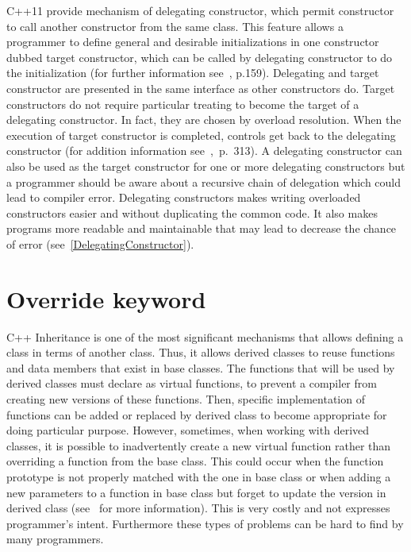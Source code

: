 \documentclass[11pt]{report}
\begin{document}
C++11 provide mechanism of delegating constructor, which permit constructor to call another constructor from the same class. This feature allows a programmer to define general and desirable initializations in one constructor dubbed target constructor, which can be called by delegating constructor to do the initialization (for further information see~\cite{Gregorie:professionalcpp}, p.159). Delegating and target constructor are presented in the same interface as other constructors do. Target constructors do not require particular treating to become the target of a delegating constructor. In fact, they are chosen by overload resolution. When the execution of target constructor is completed, controls get back to the delegating constructor (for addition information see~\cite{Overland:2011:CWF},~p.~313). A delegating constructor can also be used as the target constructor for one or more delegating constructors but a programmer should be aware about a recursive chain of delegation which could lead to compiler error. Delegating constructors makes writing overloaded constructors easier and without duplicating the common code. It also makes programs more readable and maintainable that may lead to decrease the chance of error (see~\ref{DelegatingConstructor}).

\section{Override keyword}
\label{section: Override keyword}
C++ Inheritance is one of the most significant mechanisms that allows defining a class in terms of another class. Thus, it allows derived classes to reuse functions and data members that exist in base classes. The functions that will be used by derived classes must declare as virtual functions, to prevent a compiler from creating new versions of these functions. Then, specific implementation of functions can be added or replaced by derived class to become appropriate for doing particular purpose. However, sometimes, when working with derived classes, it is possible to inadvertently create a new virtual function rather than overriding a function from the base class. This could occur when the function prototype is not properly matched with the one in base class or when adding a new parameters to a function in base class but forget to update the version in derived class (see~\cite{Stroustrup:2012:Cpp11} for more information). This is very costly and not expresses programmer's intent. Furthermore these types of problems can be hard to find by many programmers.
\end{document}
